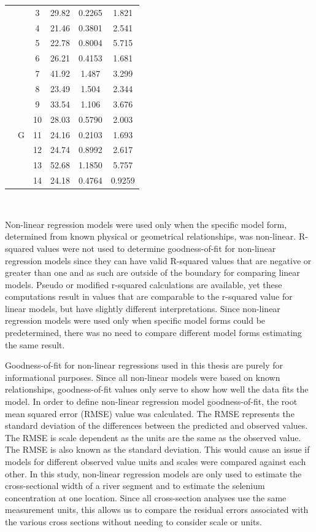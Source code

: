 \begin{table}[htbp]
\begin{tabular}{cccccc}
		&						& 3 & 29.82 & 0.2265 & 1.821\\
		& 						& 4 & 21.46 & 0.3801 & 2.541\\
		&						& 5 & 22.78 & 0.8004 & 5.715\\
		&						& 6 & 26.21 & 0.4153 & 1.681\\
		&						& 7 & 41.92 & 1.487 & 3.299\\ \cmidrule(l{0.5em}r){2-6}
		& \multirow{7}[2]{*}{G} & 8 & 23.49 & 1.504 & 2.344\\
		&						& 9 & 33.54 & 1.106 & 3.676\\
		&						& 10& 28.03 & 0.5790 & 2.003\\
		&						& 11& 24.16 & 0.2103 & 1.693\\
		&						& 12& 24.74 & 0.8992 & 2.617\\
		&						& 13& 52.68 & 1.1850 & 5.757\\
		&						& 14& 24.18 & 0.4764 & 0.9259\\
		\bottomrule
	\end{tabular}\\
\end{table}

Non-linear regression models were used only when the specific model form, determined from known physical or geometrical relationships, was non-linear.  R-squared values were not used to determine goodness-of-fit for non-linear regression models since they can have valid R-squared values that are negative or greater than one \parencite{spiess2010} and as such are outside of the boundary for comparing linear models.  Pseudo or modified r-squared calculations are available, yet these computations result in values that are comparable to the r-squared value for linear models, but have slightly different interpretations.  Since non-linear regression models were used only when specific model forms could be predetermined, there was no need to compare different model forms estimating the same result.

Goodness-of-fit for non-linear regressions used in this thesis are purely for informational purposes.  Since all non-linear models were based on known relationships, goodness-of-fit values only serve to show how well the data fits the model.  In order to define non-linear regression model goodness-of-fit, the root mean squared error (RMSE) value was calculated.  The RMSE represents the standard deviation of the differences between the predicted and observed values.  The RMSE is scale dependent as the units are the same as the observed value.  The RMSE is also known as the standard deviation.  This would cause an issue if models for different observed value units and scales were compared against each other.  In this study, non-linear regression models are only used to estimate the cross-sectional width of a river segment and to estimate the selenium concentration at one location.  Since all cross-section analyses use the same measurement units, this allows us to compare the residual errors associated with the various cross sections without needing to consider scale or units.

